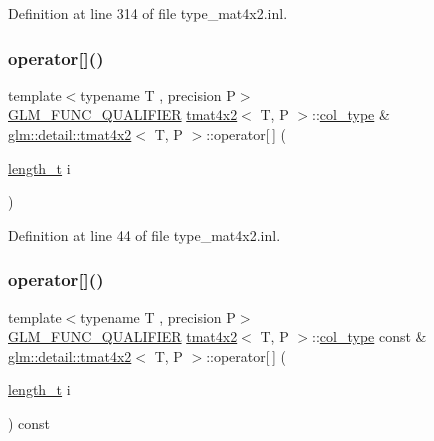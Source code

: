 Definition at line 314 of file type\+\_\+mat4x2.\+inl.

\mbox{\label{structglm_1_1detail_1_1tmat4x2_a63321d20fd080a74dbd14953d339d6fc}} 
\subsubsection{\texorpdfstring{operator[]()}{operator[]()}\hspace{0.1cm}{\footnotesize\ttfamily [1/2]}}
{\footnotesize\ttfamily template$<$typename T , precision P$>$ \\
\hyperlink{setup_8hpp_a33fdea6f91c5f834105f7415e2a64407}{G\+L\+M\+\_\+\+F\+U\+N\+C\+\_\+\+Q\+U\+A\+L\+I\+F\+I\+ER} \hyperlink{structglm_1_1detail_1_1tmat4x2}{tmat4x2}$<$ T, P $>$\+::\hyperlink{structglm_1_1detail_1_1tmat4x2_a7ff0997d9fa4f93eba8a6530ca2cd3f7}{col\+\_\+type} \& \hyperlink{structglm_1_1detail_1_1tmat4x2}{glm\+::detail\+::tmat4x2}$<$ T, P $>$\+::operator\mbox{[}$\,$\mbox{]} (\begin{DoxyParamCaption}\item[{\hyperlink{namespaceglm_a090a0de2260835bee80e71a702492ed9}{length\+\_\+t}}]{i }\end{DoxyParamCaption})}



Definition at line 44 of file type\+\_\+mat4x2.\+inl.

\mbox{\label{structglm_1_1detail_1_1tmat4x2_aa2d48c1cd14557209c89d0341e82074c}} 
\subsubsection{\texorpdfstring{operator[]()}{operator[]()}\hspace{0.1cm}{\footnotesize\ttfamily [2/2]}}
{\footnotesize\ttfamily template$<$typename T , precision P$>$ \\
\hyperlink{setup_8hpp_a33fdea6f91c5f834105f7415e2a64407}{G\+L\+M\+\_\+\+F\+U\+N\+C\+\_\+\+Q\+U\+A\+L\+I\+F\+I\+ER} \hyperlink{structglm_1_1detail_1_1tmat4x2}{tmat4x2}$<$ T, P $>$\+::\hyperlink{structglm_1_1detail_1_1tmat4x2_a7ff0997d9fa4f93eba8a6530ca2cd3f7}{col\+\_\+type} const  \& \hyperlink{structglm_1_1detail_1_1tmat4x2}{glm\+::detail\+::tmat4x2}$<$ T, P $>$\+::operator\mbox{[}$\,$\mbox{]} (\begin{DoxyParamCaption}\item[{\hyperlink{namespaceglm_a090a0de2260835bee80e71a702492ed9}{length\+\_\+t}}]{i }\end{DoxyParamCaption}) const}



